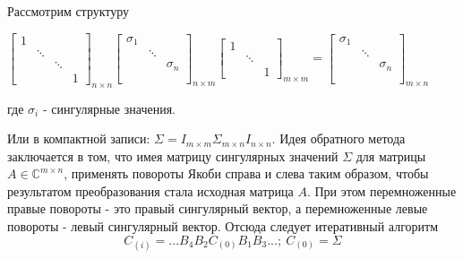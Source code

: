 Рассмотрим структуру

\begin{center}
    $\begin{bmatrix}
        1 & & & \\
         & \ddots & & \\
         & & \ddots & \\
         & & & 1
    \end{bmatrix}_{n \times n}
    \begin{bmatrix}
        \sigma_1 & & \\
         & \ddots & \\
         & & \sigma_n \\
         & & \\
         & & 
    \end{bmatrix}_{n \times m}
    \begin{bmatrix}
        1 & & \\
         & \ddots & \\
         & & 1
    \end{bmatrix}_{m \times m}
    =
    \begin{bmatrix}
        \sigma_1 & & \\
         & \ddots & \\
         & & \sigma_n \\
         & & \\
         & & 
    \end{bmatrix}_{m \times n}$
    
    \vspace{1em} 
    где $\sigma_i$ - сингулярные значения.
\end{center}

Или в компактной записи: $\Sigma = I_{m\times m}\Sigma_{m\times n}I_{n\times n}$.
Идея обратного метода заключается в том, что имея матрицу сингулярных значений $\Sigma$ для матрицы $A\in \mathbb{C}^{m\times n}$, применять повороты Якоби справа и слева таким образом, чтобы результатом преобразования стала исходная матрица $A$. При этом перемноженные правые повороты - это правый сингулярный вектор, а перемноженные левые повороты - левый сингулярный вектор. Отсюда следует итеративный алгоритм
\begin{equation}
    C_{(i)}=...B_4B_2C_{(0)}B_1B_3...;\ C_{(0)} = \Sigma
\end{equation}

